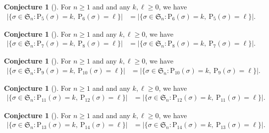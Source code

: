 \documentclass[12pt,reqno]{article}
\numberwithin{equation}{section}
\theoremstyle{plain}
\theoremstyle{definition}
\newtheorem{conjecture}[theorem]{Conjecture}
\def\fS{\mathfrak{S}}
\def\rP{\mathrm{P}}
\begin{document}
\begin{conjecture}[{\cite[part of Conj.~3]{LZ25}}]\label{conj-3}
For $n\ge 1$ and and any $k,\ell\geq 0$, we have
\begin{align*}
|\{\sigma\in\fS_n: \rP_5(\sigma)=k,~\rP_6(\sigma)=\ell\}| &= |\{\sigma\in\fS_n: \rP_6(\sigma)=k,~\rP_5(\sigma)=\ell\}|.
\end{align*}
\end{conjecture}

\begin{conjecture}[{\cite[part of Conj.~4]{LZ25}}]\label{conj-4}
For $n\ge 1$ and any $k,\ell\geq 0$, we have
\begin{align*}
|\{\sigma\in\fS_n: \rP_7(\sigma)=k,~\rP_8(\sigma)=\ell\}| &= |\{\sigma\in\fS_n: \rP_8(\sigma)=k,~\rP_7(\sigma)=\ell\}|.
\end{align*}
\end{conjecture}

\begin{conjecture}[{\cite[part of Conj.~4]{LZ25}}]\label{conj-5}
For $n\ge 1$ and any $k,\ell\geq 0$, we have
\begin{align*}
|\{\sigma\in\fS_n: \rP_9(\sigma)=k,~\rP_{10}(\sigma)=\ell\}| &= |\{\sigma\in\fS_n: \rP_{10}(\sigma)=k,~\rP_9(\sigma)=\ell\}|.
\end{align*}
\end{conjecture}

\begin{conjecture}[{\cite[part of Conj.~4]{LZ25}}]\label{conj-6}
	For $n\ge 1$ and and any $k,\ell\geq 0$, we have
	\begin{align*}
		|\{\sigma\in\fS_n: \rP_{11}(\sigma)=k,~\rP_{12}(\sigma)=\ell\}| &= |\{\sigma\in\fS_n: \rP_{12}(\sigma)=k,~\rP_{11}(\sigma)=\ell\}|.
	\end{align*}
\end{conjecture}

\begin{conjecture}[{\cite[part of Conj.~4]{LZ25}}]\label{conj-7}
	For $n\ge 1$ and and any $k,\ell\geq 0$, we have
	\begin{align*}
		|\{\sigma\in\fS_n: \rP_{13}(\sigma)=k,~\rP_{14}(\sigma)=\ell\}| &= |\{\sigma\in\fS_n: \rP_{14}(\sigma)=k,~\rP_{13}(\sigma)=\ell\}|.
	\end{align*}
\end{conjecture}
\end{document}
